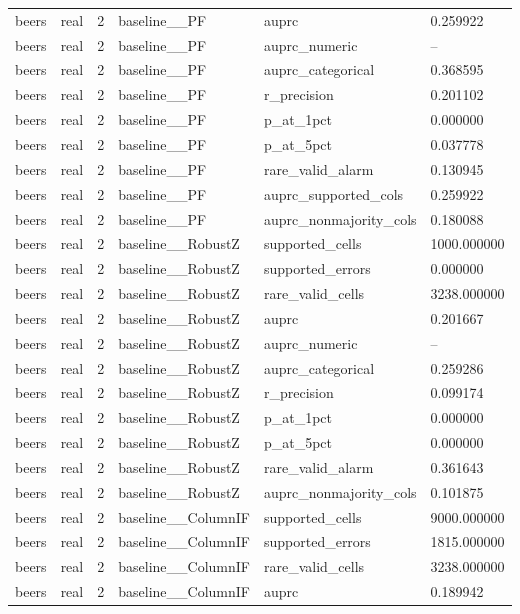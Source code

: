 \begin{tabular}{llllll}
beers & real & 2 & baseline\_\_PF & auprc & 0.259922 \\
beers & real & 2 & baseline\_\_PF & auprc\_numeric & -- \\
beers & real & 2 & baseline\_\_PF & auprc\_categorical & 0.368595 \\
beers & real & 2 & baseline\_\_PF & r\_precision & 0.201102 \\
beers & real & 2 & baseline\_\_PF & p\_at\_1pct & 0.000000 \\
beers & real & 2 & baseline\_\_PF & p\_at\_5pct & 0.037778 \\
beers & real & 2 & baseline\_\_PF & rare\_valid\_alarm & 0.130945 \\
beers & real & 2 & baseline\_\_PF & auprc\_supported\_cols & 0.259922 \\
beers & real & 2 & baseline\_\_PF & auprc\_nonmajority\_cols & 0.180088 \\
beers & real & 2 & baseline\_\_RobustZ & supported\_cells & 1000.000000 \\
beers & real & 2 & baseline\_\_RobustZ & supported\_errors & 0.000000 \\
beers & real & 2 & baseline\_\_RobustZ & rare\_valid\_cells & 3238.000000 \\
beers & real & 2 & baseline\_\_RobustZ & auprc & 0.201667 \\
beers & real & 2 & baseline\_\_RobustZ & auprc\_numeric & -- \\
beers & real & 2 & baseline\_\_RobustZ & auprc\_categorical & 0.259286 \\
beers & real & 2 & baseline\_\_RobustZ & r\_precision & 0.099174 \\
beers & real & 2 & baseline\_\_RobustZ & p\_at\_1pct & 0.000000 \\
beers & real & 2 & baseline\_\_RobustZ & p\_at\_5pct & 0.000000 \\
beers & real & 2 & baseline\_\_RobustZ & rare\_valid\_alarm & 0.361643 \\
beers & real & 2 & baseline\_\_RobustZ & auprc\_nonmajority\_cols & 0.101875 \\
beers & real & 2 & baseline\_\_ColumnIF & supported\_cells & 9000.000000 \\
beers & real & 2 & baseline\_\_ColumnIF & supported\_errors & 1815.000000 \\
beers & real & 2 & baseline\_\_ColumnIF & rare\_valid\_cells & 3238.000000 \\
beers & real & 2 & baseline\_\_ColumnIF & auprc & 0.189942 \\

\end{tabular}
